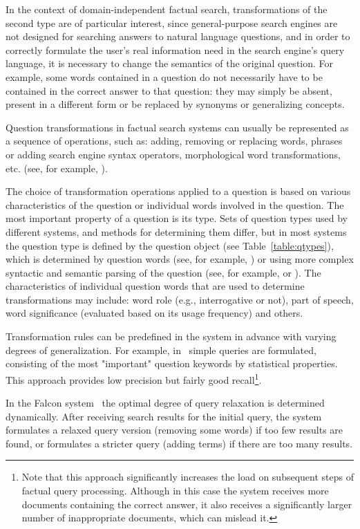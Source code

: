 \documentclass{article}
\begin{document}
In the context of domain-independent factual search,
transformations of the second type are of particular interest,
since general-purpose search engines are not designed
for searching answers to natural language questions,
and in order to correctly formulate the user's real information need
in the search engine's query language,
it is necessary to change the semantics of the original question.
For example, some words contained in a question do not necessarily
have to be contained in the correct answer to that question:
they may simply be absent, present in a different form or
be replaced by synonyms or generalizing concepts.

Question transformations in factual search systems
can usually be represented as a sequence of operations, such as:
adding, removing or replacing words, phrases or adding
search engine syntax operators,
morphological word transformations, etc. (see, for example, \cite{qa:Mulder}).

The choice of transformation operations applied to a question
is based on various characteristics of
the question or individual words involved in the question.
The most important property of a question is its type.
Sets of question types used by different systems,
and methods for determining them differ,
but in most systems
the question type is defined by the question object (see Table~\ref{table:qtypes}),
which is determined
by question words (see, for example, \cite{qa:Tritus})
or using more complex syntactic and semantic
parsing of the question (see, for example, \cite{qa:Harabagiu} or \cite{qa:clarke:passage}).
The characteristics of individual question words that are used
to determine transformations may include:
word role (e.g., interrogative or not), part of speech,
word significance (evaluated based on its usage frequency)
and others.~\cite{qa:radev:qasm}

Transformation rules can be predefined in the system in advance with varying
degrees of generalization. For example, in~\cite{qa:soubbotin} simple queries are formulated,
consisting of the most "important" question keywords by statistical
properties. This approach provides low precision but fairly good recall\footnote{
Note that this approach significantly increases the load on subsequent steps
of factual query processing.
Although in this case the system receives more documents containing
the correct answer,
it also receives
a significantly larger number of inappropriate documents,
which can mislead it.
}.

In the Falcon system~\cite{qa:Harabagiu} the optimal
degree of query relaxation is determined dynamically.
After receiving search results for the initial query, the system formulates a relaxed
query version (removing some words) if too few results are found,
or formulates a stricter query (adding terms) if there are too many results.
\end{document}
